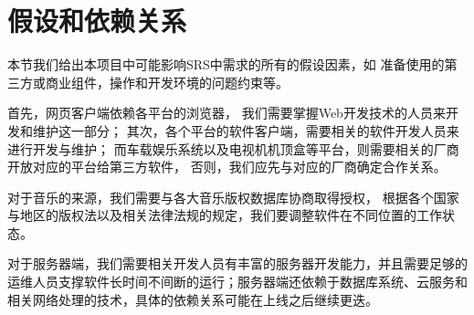 \fi
\section{假设和依赖关系}

本节我们给出本项目中可能影响SRS中需求的所有的假设因素，如
    准备使用的第三方或商业组件，操作和开发环境的问题约束等。

首先，网页客户端依赖各平台的浏览器，
    我们需要掌握Web开发技术的人员来开发和维护这一部分；
其次，各个平台的软件客户端，需要相关的软件开发人员来进行开发与维护；
而车载娱乐系统以及电视机机顶盒等平台，则需要相关的厂商开放对应的平台给第三方软件，
    否则，我们应先与对应的厂商确定合作关系。

对于音乐的来源，我们需要与各大音乐版权数据库协商取得授权，
    根据各个国家与地区的版权法以及相关法律法规的规定，我们要调整软件在不同位置的工作状态。

对于服务器端，我们需要相关开发人员有丰富的服务器开发能力，并且需要足够的运维人员支撑软件长时间不间断的运行；服务器端还依赖于数据库系统、云服务和相关网络处理的技术，具体的依赖关系可能在上线之后继续更迭。
